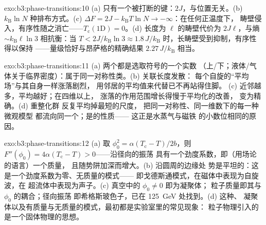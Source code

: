 \begin{solution}{exo:b3:phase-transitions:10}
(a) 只有一个被打断的键：$2J$，与位置无关。(b)
$k_{\text{B}}\ln N$ 种排布方式。(c) $\Delta F = 2J -
k_{\text{B}}T\ln N \to -\infty$：在任何正温度下，
畴壁侵入，有序性随之消亡——$T_{\text{c}}(1\text{D}) = 0$。(d)
长度为 $\ell$ 的畴壁代价为 $2J\ell$，与熵
$\sim k_{\text{B}}\ell\ln3$ 相抗衡：当 $T < 2J/k_{\text{B}}\ln3 \approx
1.8\,J/k_{\text{B}}$ 时，长畴壁受到抑制，有序性得以保持
——量级恰好与昂萨格的精确结果
$2.27\,J/k_{\text{B}}$ 相当。
\end{solution}

\begin{solution}{exo:b3:phase-transitions:11}
(a) 两个都是选取符号的一个实数
（上/下；液体/气体关于临界密度）：属于同一对称性类。(b) 关联长度发散：
每个自旋的“平均场”与其自身一样涨落剧烈，
用邻居的平均值来代替已不再站得住脚。
(c) 近邻越多，平均越好；在四维以上，
涨落的作用范围增长得慢于平均化的改善，
变为精确。(d) 重整化群
反复平均掉最短的尺度，
把同一对称性、同一维数下的每一种微观模型
都流向同一个；是的性质——
这正是水蒸气与磁铁
的小数位相同的原因。
\end{solution}

\begin{solution}{exo:b3:phase-transitions:12}
(a) 取 $\phi_0^2 = \alpha(T_{\text{c}} - T)/2b$，则 $F''(\phi_0) =
4\alpha(T_{\text{c}} - T) > 0$——沿径向的振荡
具有一个劲度系数，即（用场论的语言）一个质量，
且随势阱加深而增大。(b) 沿圆周的边缘处
势是平坦的：这是一个劲度系数为零、无质量的模式——
即戈德斯通模式，在磁体中表现为自旋波，在
超流体中表现为声子。(c) 真空中的 $\phi_0 \neq 0$ 即为凝聚体；
粒子质量即其与 $\phi_0$ 的耦合；径向振荡
即希格斯玻色子，已在 \qty{125}{GeV} 处找到。(d) 这种、
凝聚体以及有质量与无质量的模式，最初都是实验室里的常见现象：
粒子物理引入的是一个固体物理的思想。
\end{solution}

